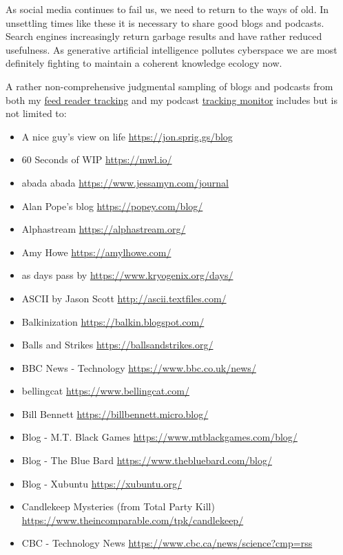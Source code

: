 As social media continues to fail us, we need to return to the ways of
old. In unsettling times like these it is necessary to share good blogs
and podcasts. Search engines increasingly return garbage results and
have rather reduced usefulness. As generative artificial intelligence
pollutes cyberspace we are most definitely fighting to maintain a
coherent knowledge ecology now.

A rather non-comprehensive judgmental sampling of blogs and podcasts
from both my
\href{https://code.launchpad.net/~skellat/+git/FeedReadingFeeds}{feed
reader tracking} and my podcast
\href{https://code.launchpad.net/~skellat/+git/Podcasting}{tracking
monitor} includes but is not limited to:

\begin{itemize}
\item
  A nice guy's view on life \url{https://jon.sprig.gs/blog}
\item
  60 Seconds of WIP \url{https://mwl.io/}
\item
  abada abada \url{https://www.jessamyn.com/journal}
\item
  Alan Pope's blog \url{https://popey.com/blog/}
\item
  Alphastream \url{https://alphastream.org/}
\item
  Amy Howe \url{https://amylhowe.com/}
\item
  as days pass by \url{https://www.kryogenix.org/days/}
\item
  ASCII by Jason Scott \url{http://ascii.textfiles.com/}
\item
  Balkinization \url{https://balkin.blogspot.com/}
\item
  Balls and Strikes \url{https://ballsandstrikes.org/}
\item
  BBC News - Technology \url{https://www.bbc.co.uk/news/}
\item
  bellingcat \url{https://www.bellingcat.com/}
\item
  Bill Bennett \url{https://billbennett.micro.blog/}
\item
  Blog - M.T. Black Games \url{https://www.mtblackgames.com/blog/}
\item
  Blog - The Blue Bard \url{https://www.thebluebard.com/blog/}
\item
  Blog - Xubuntu \url{https://xubuntu.org/}
\item
  Candlekeep Mysteries (from Total Party Kill)
  \url{https://www.theincomparable.com/tpk/candlekeep/}
\item
  CBC - Technology News \url{https://www.cbc.ca/news/science?cmp=rss}

\end{itemize}
